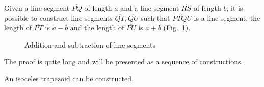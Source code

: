 \begin{theorem}\label{thm.add-subtract-mm}
Given a line segment $\overline{PQ}$ of length $a$ and a line segment $\overline{RS}$ of length $b$, it is possible to construct line segments $\overline{QT}, \overline{QU}$ such that $\overline{PTQU}$ is a line segment, the length of $\overline{PT}$ is $a-b$ and the length of $\overline{PU}$ is $a+b$ (Fig.~\ref{f.compass-add1}).
\end{theorem}
\begin{figure}[ht]
\begin{center}
\end{center}
\caption{Addition and subtraction of line segments}\label{f.compass-add1}
\end{figure}

The proof is quite long and will be presented as a sequence of constructions.

\begin{theorem}\label{thm.compass-trapezoid}
An isoceles trapezoid can be constructed.
\end{theorem}

